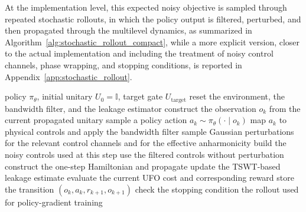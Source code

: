 At the implementation level, this expected noisy objective is sampled through repeated stochastic rollouts, in which the policy output is filtered, perturbed, and then propagated through the multilevel dynamics, as summarized in Algorithm~\ref{alg:stochastic_rollout_compact}, while a more explicit version, closer to the actual implementation and including the treatment of noisy control channels, phase wrapping, and stopping conditions, is reported in Appendix~\ref{app:stochastic_rollout}.

\begin{algorithm}[t]
\caption{Sampling a rollout in the stochastic training environment}
\label{alg:stochastic_rollout_compact}
\begin{algorithmic}[1]
\Require policy $\pi_\theta$, initial unitary $U_0=\mathbb{I}$, target gate $U_{\mathrm{target}}$
\State reset the environment, the bandwidth filter, and the leakage estimator
    \State construct the observation $o_k$ from the current propagated unitary
    \State sample a policy action $a_k \sim \pi_\theta(\cdot \mid o_k)$
    \State map $a_k$ to physical controls and apply the bandwidth filter
        \State sample Gaussian perturbations for the relevant control channels and for the effective anharmonicity
        \State build the noisy controls used at this step
    \Else
        \State use the filtered controls without perturbation
    \EndIf
    \State construct the one-step Hamiltonian and propagate
    \State update the TSWT-based leakage estimate
    \State evaluate the current UFO cost and corresponding reward
    \State store the transition $(o_k,a_k,r_{k+1},o_{k+1})$
    \State check the stopping condition
\EndFor
\State \Return the rollout used for policy-gradient training
\end{algorithmic}
\end{algorithm}


